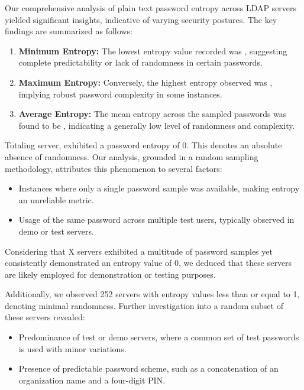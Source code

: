 Our comprehensive analysis of plain text password entropy across LDAP servers yielded significant insights, indicative of varying security postures. The key findings are summarized as follows:

\begin{enumerate}
    \item \textbf{Minimum Entropy:} The lowest entropy value recorded was , suggesting complete predictability or lack of randomness in certain passwords.
    \item \textbf{Maximum Entropy:} Conversely, the highest entropy observed was , implying robust password complexity in some instances.
    \item \textbf{Average Entropy:} The mean entropy across the sampled passwords was found to be , indicating a generally low level of randomness and complexity.
\end{enumerate}

Totaling  server, exhibited a password entropy of 0. This denotes an absolute absence of randomness. Our analysis, grounded in a random sampling methodology, attributes this phenomenon to several factors:

\begin{itemize}
    \item Instances where only a single password sample was available, making entropy an unreliable metric.
    \item Usage of the same password across multiple test users, typically observed in demo or test servers.
\end{itemize}

Considering that X servers exhibited a multitude of password samples yet consistently demonstrated an entropy value of 0, we deduced that these servers are likely employed for demonstration or testing purposes.

Additionally, we observed 252 servers with entropy values less than or equal to 1, denoting minimal randomness. Further investigation into a random subset of these servers revealed:

\begin{itemize}
    \item Predominance of test or demo servers, where a common set of test passwords is used with minor variations.
    \item Presence of predictable password scheme, such as a concatenation of an organization name and a four-digit PIN.
\end{itemize}

